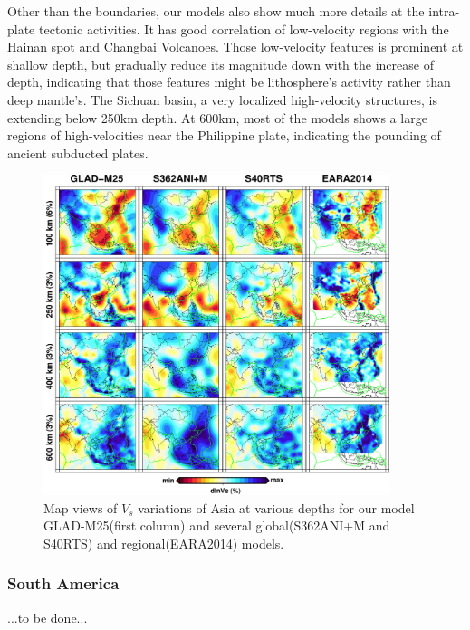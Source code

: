 \documentclass[extra,mreferee]{gji}
\begin{document}
Other than the boundaries, our models also show much more details at the
intra-plate tectonic activities. It has good correlation of low-velocity regions with
the Hainan spot and Changbai Volcanoes. Those low-velocity features is prominent at
shallow depth, but gradually reduce its magnitude down with the increase of
depth, indicating that those features might be lithosphere's activity rather
than deep mantle's.
The Sichuan basin, a very localized high-velocity structures, is extending below
250km depth. At 600km, most of the models shows a large regions of high-velocities
near the Philippine plate, indicating the pounding of ancient subducted plates.

\begin{figure}
\includegraphics[width=0.9\textwidth]{figures/depth_slice/asia_vs.pdf}
  \caption{Map views of $V_s$ variations of Asia at various depths for our model GLAD-M25(first column) and several global(S362ANI+M and S40RTS) and regional(EARA2014\citep{chen2015multiparameter}) models.}
\label{fig:asia-vs}
\centering
\end{figure}

\subsubsection{South America}
...to be done...
\end{document}
